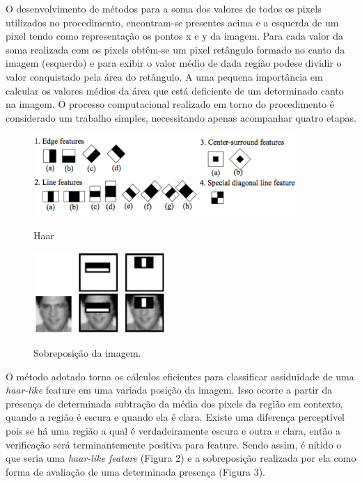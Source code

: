\documentclass[12pt,a4paper]{article}
\begin{document}
O desenvolvimento de métodos para a soma dos valores de todos os pixels utilizados no
procedimento, encontram-se presentes acima e a esquerda de um pixel tendo como representação os
pontos x e y da imagem. Para cada valor da soma realizada com os pixels obtêm-se um pixel
retângulo formado no canto da imagem (esquerdo) e para exibir o valor médio de dada região podese
dividir o valor conquistado pela área do retângulo. A uma pequena importância em calcular os
valores médios da área que está deficiente de um determinado canto na imagem. O processo
computacional realizado em torno do procedimento é considerado um trabalho simples,
necessitando apenas acompanhar quatro etapas.







\begin{figure}[h!]
\centering
\includegraphics[width=10cm]{recursos/imagens/Haar.png}
\label{2}
\caption{Haar}
\end{figure} 



\begin{figure}[h!]
\centering
\includegraphics[width=5cm]{recursos/imagens/sobreposicao.png}
\label{4}
\caption{Sobreposição da imagem.}
\end{figure} 


O método adotado torna os cálculos eficientes para classificar assiduidade de uma \textit{haar-like} feature em uma variada posição da imagem. Isso ocorre a partir da presença de determinada subtração da média dos pixels da região em contexto, quando a região é escura e quando ela é clara. Existe uma diferença perceptível pois se há uma região a qual é verdadeiramente escura e outra e clara, então a verificação será terminantemente positiva para feature. Sendo assim, é nítido o que seria uma \textit{haar-like feature} (Figura 2) e a sobreposição realizada por ela como forma de avaliação de uma determinada presença (Figura 3).
\end{document}
